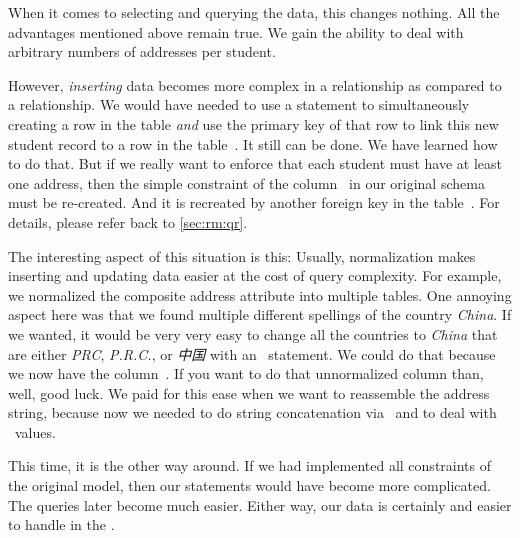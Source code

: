 When it comes to selecting and querying the data, this changes nothing.
All the advantages mentioned above remain true.
We gain the ability to deal with arbitrary numbers of addresses per student.

However, \emph{inserting} data becomes more complex in a  relationship as compared to a  relationship.
We would have needed to use a  statement to simultaneously creating a row in the  table \emph{and} use the primary key of that row to link this new student record to a row in the table~.
It still can be done.
We have learned how to do that.
But if we really want to enforce that each student must have at least one address, then the simple  constraint of the column~ in our original schema must be re-created.
And it is recreated by another foreign key in the table~.
For details, please refer back to \cref{sec:rm:qr}.

The interesting aspect of this situation is this:
Usually, normalization makes inserting and updating data easier at the cost of query complexity.
For example, we normalized the composite address attribute into multiple tables.
One annoying aspect here was that we found multiple different spellings of the country \emph{China}.
If we wanted, it would be very very easy to change all the countries to \emph{China} that are either \emph{PRC}, \emph{P.R.C.}, or \emph{中国} with an ~statement.
We could do that because we now have the column~.
If you want to do that unnormalized  column than, well, good luck.
We paid for this ease when we want to reassemble the address string, because now we needed to do string concatenation via~\sqlil{||}\sqlIdx{\textbar\textbar} and  to deal with ~values.

This time, it is the other way around.
If we had implemented all constraints of the original model, then our  statements would have become more complicated.
The queries later become much easier.
Either way, our data is certainly  and easier to handle in the .%
\FloatBarrier%
\endhsection%
\endhsection%
%
